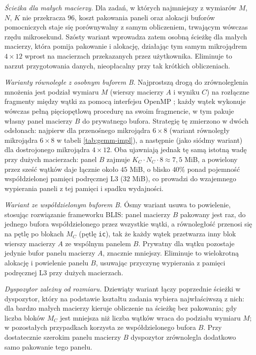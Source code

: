 \documentclass[a4paper,12pt]{book} %
\begin{document}
\emph{Ścieżka dla małych macierzy.} Dla zadań, w których najmniejszy z wymiarów $M$, $N$, $K$ nie przekracza $96$, koszt pakowania paneli oraz alokacji buforów pomocniczych staje się porównywalny z samym obliczeniem, trwającym wówczas rzędu mikrosekund. Szósty wariant wprowadza zatem osobną ścieżkę dla małych macierzy, która pomija pakowanie i alokację, działając tym samym mikrojądrem $4 \times 12$ wprost na macierzach przekazanych przez użytkownika. Eliminuje to narzut przygotowania danych, nieopłacalny przy tak krótkich obliczeniach.

\emph{Warianty równoległe z osobnym buforem B.} Najprostszą drogą do zrównoleglenia mnożenia jest podział wymiaru $M$ (wierszy macierzy $A$ i wyniku $C$) na rozłączne fragmenty między wątki za pomocą interfejsu OpenMP \cite{openmp52}; każdy wątek wykonuje wówczas pełną pięciopętlową procedurę na swoim fragmencie, w tym pakuje własny panel macierzy $B$ do prywatnego bufora. Strategię tę zmierzono w dwóch odsłonach: najpierw dla przenośnego mikrojądra $6 \times 8$ (wariant równoległy mikrojądra $6 \times 8$ w tabeli \ref{tab:gemm-impl}), a następnie (jako siódmy wariant) dla dostrojonego mikrojądra $4 \times 12$. Oba ujawniają jednak tę samą istotną wadę przy dużych macierzach: panel $B$ zajmuje $K_C \cdot N_C \cdot 8 \approx 7{,}5$ MiB, a powielony przez sześć wątków daje łącznie około $45$ MiB, o blisko 40\% ponad pojemność współdzielonej pamięci podręcznej L3 ($32$ MiB), co prowadzi do wzajemnego wypierania paneli z tej pamięci i spadku wydajności.

\emph{Wariant ze współdzielonym buforem B.} Ósmy wariant usuwa to powielenie, stosując rozwiązanie frameworku BLIS: panel macierzy $B$ pakowany jest raz, do jednego bufora współdzielonego przez wszystkie wątki, a równoległość przenosi się na pętlę po blokach $M_C$ (pętlę \texttt{ic}), tak że każdy wątek przetwarza inny blok wierszy macierzy $A$ ze wspólnym panelem $B$. Prywatny dla wątku pozostaje jedynie bufor panelu macierzy $A$, znacznie mniejszy. Eliminuje to wielokrotną alokację i powielenie panelu $B$, usuwając przyczynę wypierania z pamięci podręcznej L3 przy dużych macierzach.

\emph{Dyspozytor zależny od rozmiaru.} Dziewiąty wariant łączy poprzednie ścieżki w dyspozytor, który na podstawie kształtu zadania wybiera najwłaściwszą z nich: dla bardzo małych macierzy kieruje obliczenie na ścieżkę bez pakowania; gdy liczba bloków $M_C$ jest mniejsza niż liczba wątków wraca do podziału wymiaru $M$; w pozostałych przypadkach korzysta ze współdzielonego bufora $B$. Przy dostatecznie szerokim panelu macierzy $B$ dyspozytor zrównolegla dodatkowo samo pakowanie tego panelu.
\end{document}
